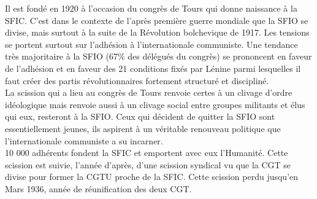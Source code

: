 \documentclass[10pt, a4paper, openany]{book}
\begin{document}
Il est fondé en 1920 à l'occasion du congrès de Tours qui donne naissance à la SFIC. C'est dans le contexte de l'après première guerre mondiale que la SFIO se divise, mais surtout à la suite de la Révolution bolchevique de 1917. Les tensions se portent surtout sur l'adhésion à l'internationale communiste. Une tendance très majoritaire à la SFIO (67\% des délégués du congrès) se prononcent en faveur de l'adhésion et en faveur des 21 conditions fixés par Lénine parmi lesquelles il faut créer des partis révolutionnaires fortement structuré et discipliné. \\
La scission qui a lieu au congrès de Tours renvoie certes à un clivage d'ordre idéologique mais renvoie aussi à un clivage social entre groupes militants et élus qui eux, resteront à la SFIO. Ceux qui décident de quitter la SFIO sont essentiellement jeunes, ils aspirent à un véritable renouveau politique que l'internationale communiste a su incarner. \\
10 000 adhérents fondent la SFIC et emportent avec eux l'Humanité. Cette scission est suivie, l'année d'après, d'une scission syndical vu que la CGT se divise pour former la CGTU proche de la SFIC. Cette scission perdu jusqu'en Mars 1936, année de réunification des deux CGT. \\
\end{document}

